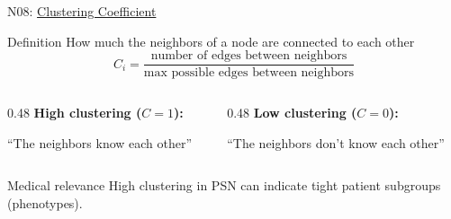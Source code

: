 \documentclass[aspectratio=169, 10pt]{beamer}
\begin{document}
\begin{frame}{N08: \href{https://en.wikipedia.org/wiki/Clustering_coefficient}{Clustering Coefficient}}
    
    \begin{block}{Definition}
        How much the neighbors of a node are connected to each other
        \[
        C_i = \frac{\text{number of edges between neighbors}}{\text{max possible edges between neighbors}}
        \]
    \end{block}
    
    \vspace{2mm}
    
    \begin{columns}
        \begin{column}{0.48\textwidth}
            \textbf{High clustering ($C = 1$):}
            \begin{center}
            \end{center}
            ``The neighbors know each other''
        \end{column}
        
        \begin{column}{0.48\textwidth}
            \textbf{Low clustering ($C = 0$):}
            \begin{center}
            \end{center}
            ``The neighbors don't know each other''
        \end{column}
    \end{columns}
    
    \vspace{1mm}
    
    \begin{block}{\footnotesize Medical relevance}
        \footnotesize High clustering in PSN can indicate tight patient subgroups (phenotypes).
    \end{block}
    
\end{frame}
\end{document}
